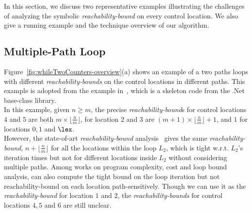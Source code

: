 In this section, we discuss two representative examples illustrating the
challenges of analyzing the symbolic
\emph{reachability-bound} on
every control location.
%
We also give a running example and the technique overview of our algorithm.

\subsection{Multiple-Path Loop}
\label{sec:overview-multiplepath}

Figure~\ref{fig:whileTwoCounters-overview}(a) shows an example of a two paths loops
with different \emph{reachability-bounds} on the control locations in different paths.
This example is adopted from the example in~\cite{GulwaniZ10}, which
is a skeleton code from the .Net base-class library.
\\
In this example, given $n \geq m$,
the precise \emph{reachability-bound}s for control locations $4$ and $5$ are both $m \times \lfloor\frac{n}{m}\rfloor$,
for location $2$ and $3$ are $(m + 1) \times \lfloor\frac{n}{m}\rfloor + 1$, 
and $1$ for locations $0, 1$ and $\lex$. 
\\
However, the state-of-art \emph{reachability-bound} analysis~\cite{GulwaniZ10}
gives the same \emph{reachability-bound}, $n + \lfloor\frac{n}{m}\rfloor$ for all the locations within the loop $L_2$, which is tight w.r.t. $L_2$'s iteration times but not for different locations inside $L_2$ without considering multiple paths.
Among works on program complexity, cost and loop bound analysis, \cite{GulwaniJK09} can also compute the tight bound on the loop iteration but not reachability-bound on each location path-sensitively.
Though we can use it as the \emph{reachability-bound} for location $1$ and $2$,
the \emph{reachability-bounds} for control locations $4, 5$ and $6$ are still unclear.


